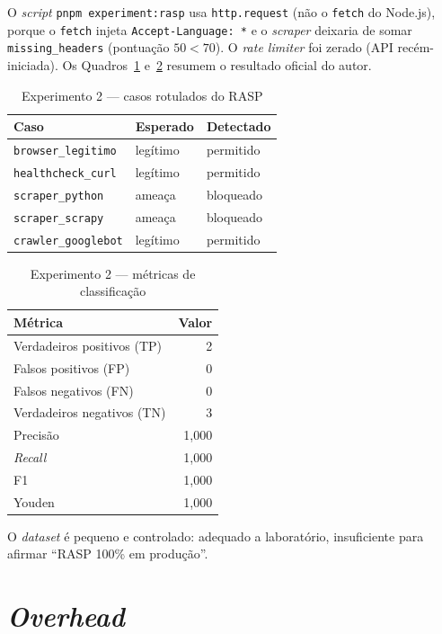 \documentclass[
  12pt,
  oneside,
  a4paper,
  english,
  brazil,
  sumario=tradicional
]{abntex2}
\begin{document}
O \textit{script} \texttt{pnpm experiment:rasp} usa \texttt{http.request} (não o \texttt{fetch} do Node.js), porque o \texttt{fetch} injeta \texttt{Accept-Language: *} e o \textit{scraper} deixaria de somar \texttt{missing\_headers} (pontuação $50 < 70$). O \textit{rate limiter} foi zerado (API recém-iniciada). Os Quadros~\ref{tab:rasp-casos} e~\ref{tab:rasp-metricas} resumem o resultado oficial do autor.

\begin{table}[htbp]
\caption{Experimento 2 --- casos rotulados do RASP}
\label{tab:rasp-casos}
\centering
\begin{tabular}{@{}lll@{}}
\toprule
\textbf{Caso} & \textbf{Esperado} & \textbf{Detectado} \\
\midrule
\texttt{browser\_legitimo} & legítimo & permitido \\
\texttt{healthcheck\_curl} & legítimo & permitido \\
\texttt{scraper\_python} & ameaça & bloqueado \\
\texttt{scraper\_scrapy} & ameaça & bloqueado \\
\texttt{crawler\_googlebot} & legítimo & permitido \\
\bottomrule
\end{tabular}
\end{table}

\begin{table}[htbp]
\caption{Experimento 2 --- métricas de classificação}
\label{tab:rasp-metricas}
\centering
\begin{tabular}{@{}lr@{}}
\toprule
\textbf{Métrica} & \textbf{Valor} \\
\midrule
Verdadeiros positivos (TP) & 2 \\
Falsos positivos (FP) & 0 \\
Falsos negativos (FN) & 0 \\
Verdadeiros negativos (TN) & 3 \\
Precisão & 1,000 \\
\textit{Recall} & 1,000 \\
F1 & 1,000 \\
Youden & 1,000 \\
\bottomrule
\end{tabular}
\end{table}

O \textit{dataset} é pequeno e controlado: adequado a laboratório, insuficiente para afirmar ``RASP 100\% em produção''.

\section{\textit{Overhead}}
\end{document}
